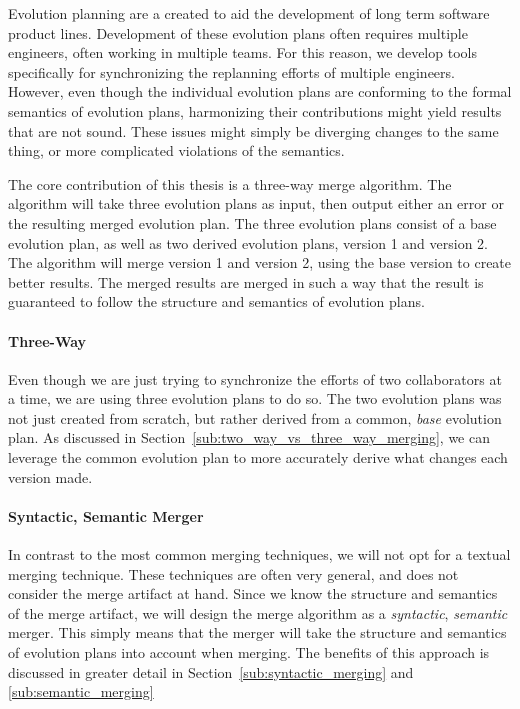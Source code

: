 \documentclass[a4paper,english]{ifimaster}
\begin{document}
Evolution planning are a created to aid the development of long term software product lines. Development of these evolution plans often requires multiple engineers, often working in multiple teams. For this reason, we develop tools specifically for synchronizing the replanning efforts of multiple engineers. However, even though the individual evolution plans are conforming to the formal semantics of evolution plans, harmonizing their contributions might yield results that are not sound. These issues might simply be diverging changes to the same thing, or more complicated violations of the semantics.

The core contribution of this thesis is a three-way merge algorithm. The algorithm will take three evolution plans as input, then output either an error or the resulting merged evolution plan. The three evolution plans consist of a base evolution plan, as well as two derived evolution plans, version 1 and version 2. The algorithm will merge version 1 and version 2, using the base version to create better results. The merged results are merged in such a way that the result is guaranteed to follow the structure and semantics of evolution plans.

\paragraph{Three-Way}%
\label{par:three_way}

Even though we are just trying to synchronize the efforts of two collaborators at a time, we are using three evolution plans to do so. The two evolution plans was not just created from scratch, but rather derived from a common, \textit{base} evolution plan. As discussed in Section~\vref{sub:two_way_vs_three_way_merging}, we can leverage the common evolution plan to more accurately derive what changes each version made.

\paragraph{Syntactic, Semantic Merger}%
\label{par:semantic_merger}

In contrast to the most common merging techniques, we will not opt for a textual merging technique. These techniques are often very general, and does not consider the merge artifact at hand. Since we know the structure and semantics of the merge artifact, we will design the merge algorithm as a \textit{syntactic}, \textit{semantic} merger. This simply means that the merger will take the structure and semantics of evolution plans into account when merging. The benefits of this approach is discussed in greater detail in Section~\vref{sub:syntactic_merging} and \vref{sub:semantic_merging}
\end{document}
